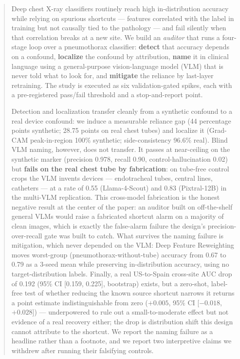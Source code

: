 \documentclass{ieeeaccess}
\begin{document}
\begin{abstract}
Deep chest X-ray classifiers routinely reach high in-distribution accuracy while relying on spurious shortcuts --- features correlated with the label in training but not causally tied to the pathology --- and fail silently when that correlation breaks at a new site. We build an \emph{auditor} that runs a four-stage loop over a pneumothorax classifier: \textbf{detect} that accuracy depends on a confound, \textbf{localize} the confound by attribution, \textbf{name} it in clinical language using a general-purpose vision-language model (VLM) that is never told what to look for, and \textbf{mitigate} the reliance by last-layer retraining. The study is executed as six validation-gated spikes, each with a pre-registered pass/fail threshold and a stop-and-report point.

Detection and localization transfer cleanly from a synthetic confound to a real device confound: we induce a measurable reliance gap (44 percentage points synthetic; 28.75 points on real chest tubes) and localize it (Grad-CAM peak-in-region 100\% synthetic; side-consistency 96.6\% real). Blind VLM naming, however, does not transfer. It passes at near-ceiling on the synthetic marker (precision 0.978, recall 0.90, control-hallucination 0.02) but \textbf{fails on the real chest tube by fabrication}: on tube-free control crops the VLM invents devices --- endotracheal tubes, central lines, catheters --- at a rate of 0.55 (Llama-4-Scout) and 0.83 (Pixtral-12B) in the multi-VLM replication. This cross-model fabrication is the honest negative result at the center of the paper: an auditor built on off-the-shelf general VLMs would raise a fabricated shortcut alarm on a majority of clean images, which is exactly the false-alarm failure the design's precision-over-recall gate was built to catch. What survives the naming failure is mitigation, which never depended on the VLM: Deep Feature Reweighting moves worst-group (pneumothorax-without-tube) accuracy from 0.67 to 0.79 as a 3-seed mean while preserving in-distribution accuracy, using no target-distribution labels. Finally, a real US-to-Spain cross-site AUC drop of 0.192 (95\% CI [0.159, 0.225], bootstrap) exists, but a zero-shot, label-free test of whether reducing the known source shortcut narrows it returns a point estimate indistinguishable from zero ($+0.005$, 95\% CI [$-0.018$, $+0.028$]) --- underpowered to rule out a small-to-moderate effect but not evidence of a real recovery either; the drop is distribution shift this design cannot attribute to the shortcut. We report the naming failure as a headline rather than a footnote, and we report two interpretive claims we withdrew after running their falsifying controls.
\end{abstract}
\end{document}
